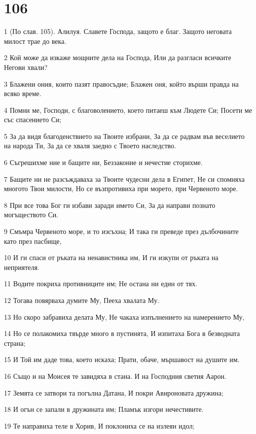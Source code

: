 \chapter{106}

\par 1 (По слав. 105). Алилуя. Славете Господа, защото е благ. Защото неговата милост трае до века.
\par 2 Кой може да изкаже мощните дела на Господа, Или да разгласи всичките Негови хвали?
\par 3 Блажени ония, които пазят правосъдие; Блажен оня, който върши правда на всяко време.
\par 4 Помни ме, Господи, с благоволението, което питаеш към Людете Си; Посети ме със спасението Си;
\par 5 За да видя благоденствието на Твоите избрани, За да се радвам във веселието на народа Ти, За да се хваля заедно с Твоето наследство.
\par 6 Съгрешихме ние и бащите ни, Беззаконие и нечестие сторихме.
\par 7 Бащите ни не разсъждаваха за Твоите чудесни дела в Египет, Не си спомняха многото Твои милости, Но се възпротивиха при морето, при Червеното море.
\par 8 При все това Бог ги избави заради името Си, За да направи познато могъществото Си.
\par 9 Смъмра Червеното море, и то изсъхна; И така ги преведе през дълбочините като през пасбище,
\par 10 И ги спаси от ръката на ненавистника им, И ги изкупи от ръката на неприятеля.
\par 11 Водите покриха противниците им; Не остана ни един от тях.
\par 12 Тогава повярваха думите Му, Пееха хвалата Му.
\par 13 Но скоро забравиха делата Му, Не чакаха изпълнението на намерението Му,
\par 14 Но се полакомиха твърде много в пустинята, И изпитаха Бога в безводната страна;
\par 15 И Той им даде това, което искаха; Прати, обаче, мършавост на душите им.
\par 16 Също и на Моисея те завидяха в стана. И на Господния светия Аарон.
\par 17 Земята се затвори та погълна Датана, И покри Авироновата дружина;
\par 18 И огън се запали в дружината им; Пламък изгори нечестивите.
\par 19 Те направиха теле в Хорив, И поклониха се на излеян идол;
